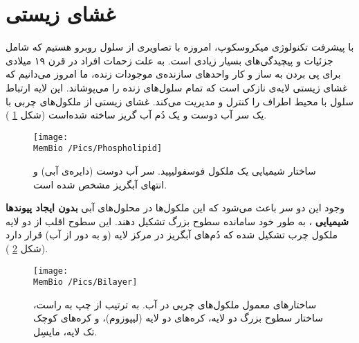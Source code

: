 \setRL
{} 


\section{
غشای زیستی
}
با پیشرفت تکنولوژی میکروسکوپ،‌ امروزه با تصاویری از سلول روبرو هستیم که شامل جزئیات و پیچیدگی‌های بسیار زیادی است. به علت زحمات افراد در قرن ۱۹ میلادی برای پی بردن به ساز و کار واحد‌های سازنده‌ی موجودات زنده، ما امروز می‌دانیم که غشای زیستی لایه‌ی نازکی است که تمام سلول‌های زنده را می‌پوشاند. این لایه ارتباط سلول با محیط اطراف را کنترل و مدیریت می‌کند. غشای زیستی از ملکول‌های چربی
با یک سر آب دوست
 و یک دُم آب گریز
 ساخته شده‌است (شکل
\ref{fig:phospholipid}
).
 
 \begin{figure}[h]
\begin{center}
\texttt{[image: \\MemBio /Pics/Phospholipid]}
\caption{
ساختار شیمیایی یک ملکول فوسفولیپید. سر آب دوست (دایره‌ی آبی) و  انتهای آبگریز مشخص شده است.
}
\label{fig:phospholipid}
\end{center}
\end{figure}
 
 
  وجود این دو سر باعث می‌شود که این ملکول‌ها در محلول‌های آبی
\textbf{بدون ایجاد پیوندها شیمیایی}
، به طور خود سامانده
 سطوح بزرگ تشکیل دهند. این سطوح اقلب از دو لایه ملکول چرب تشکیل شده که دُم‌های  آبگریز در مرکز لایه (و به دور از آب) قرار دارد (شکل
\ref{fig:bilayer}
 ).
\begin{figure}[h]
\begin{center}
\texttt{[image: \\MemBio /Pics/Bilayer]}
\caption{
ساختار‌های معمول ملکول‌های چربی در آب. به ترتیب از چپ به راست، ساختار سطوح بزرگ دو لایه، کره‌های دو لایه (لیپوزوم)، و کره‌های کوچک تک لایه، مایسِل.
}
\label{fig:bilayer}
\end{center}
\end{figure}
 
 
 
 
 
 
 
 
 
 
 
 
 
 
 
 
 
 
 